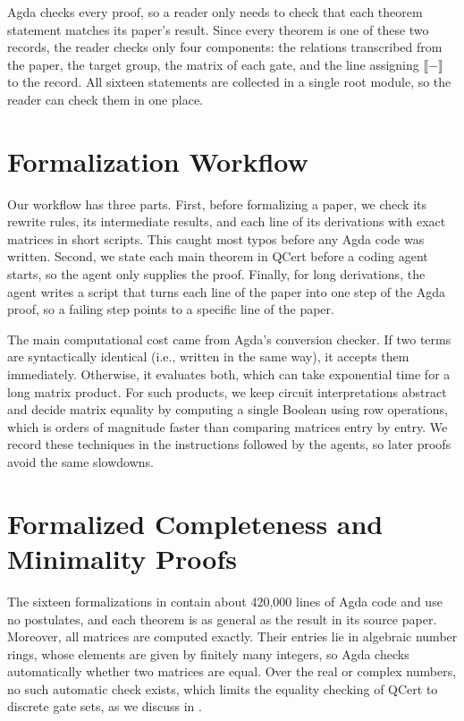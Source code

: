 \documentclass[acmsmall,nonacm,11pt,screen]{acmart}
\begin{document}
Agda checks every proof, so a reader only needs to check that each theorem statement matches its paper's result. Since every theorem is one of these two records, the reader checks only four components: the relations transcribed from the paper, the target group, the matrix of each gate, and the line assigning $\llbracket - \rrbracket$ to the record. All sixteen statements are collected in a single root module, so the reader can check them in one place.

\section{Formalization Workflow}\label{sec:method}

Our workflow has three parts. First, before formalizing a paper, we check its rewrite rules, its intermediate results, and each line of its derivations with exact matrices in short scripts. This caught most typos before any Agda code was written. Second, we state each main theorem in QCert before a coding agent starts, so the agent only supplies the proof. Finally, for long derivations, the agent writes a script that turns each line of the paper into one step of the Agda proof, so a failing step points to a specific line of the paper. 

The main computational cost came from Agda's conversion checker. If two terms are syntactically identical (i.e., written in the same way), it accepts them immediately. Otherwise, it evaluates both, which can take exponential time for a long matrix product. For such products, we keep circuit interpretations abstract and decide matrix equality by computing a single Boolean using row operations, which is orders of magnitude faster than comparing matrices entry by entry. We record these techniques in the instructions followed by the agents, so later proofs avoid the same slowdowns.

\section{Formalized Completeness and Minimality Proofs}\label{sec:corpus}

The sixteen formalizations in  contain about 420{,}000 lines of Agda code and use no postulates, and each theorem is as general as the result in its source paper. Moreover, all matrices are computed exactly. Their entries lie in algebraic number rings, whose elements are given by finitely many integers, so Agda checks automatically whether two matrices are equal. Over the real or complex numbers, no such automatic check exists, which limits the equality checking of QCert to discrete gate sets, as we discuss in .
\end{document}
